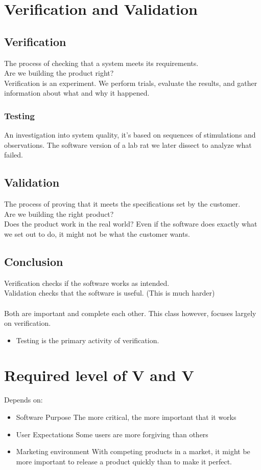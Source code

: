 \section{Verification and Validation}
\subsection{Verification}
The process of checking that a system meets its requirements.\\ \indent
Are we building the product right?\\
Verification is an experiment. We perform trials, evaluate the results, and gather information about what and why it happened.
\subsubsection{Testing}
An investigation into system quality, it's based on sequences of stimulations and observations. The software version of a lab rat we later dissect to analyze what failed.\\

\subsection{Validation}
The process of proving that it meets the specifications set by the customer. \\\indent
Are we building the right product?\\
Does the product work in the real world? Even if the software does exactly what we set out to do, it might not be what the customer wants.\\

\subsection{Conclusion}
Verification checks if the software works as intended.\\
Validation checks that the software is useful. (This is much harder)\\
\\
Both are important and complete each other. This class however, focuses largely on verification.
\begin{itemize}
	\item Testing is the primary activity of verification.
\end{itemize}
\section{Required level of V and V}
Depends on:
\begin{itemize}
	\item Software Purpose
	      \subitem The more critical, the more important that it works
	\item User Expectations
	      \subitem Some users are more forgiving than others
	\item Marketing environment
	      \subitem With competing products in a market, it might be more important to release a product quickly than to make it perfect.
\end{itemize}

